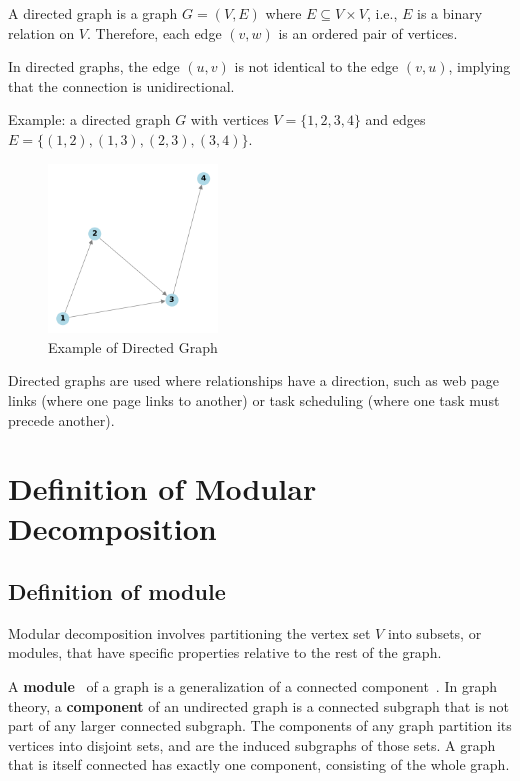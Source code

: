 A directed graph is a graph $G = (V, E)$ where $E \subseteq V \times V$, i.e., $E$ is a binary relation on $V$.
Therefore, each edge $(v, w)$ is an ordered pair of vertices.

In directed graphs, the edge $(u, v)$ is not identical to the edge $(v, u)$, implying that the connection is unidirectional.

Example: a directed graph $G$ with vertices $V = \{1, 2, 3, 4\}$ and edges $E = \{(1, 2), (1, 3), (2, 3), (3 , 4)\}$.

\begin{figure}[!h]
    \centering
    \includegraphics[width=0.40\textwidth]{images/graphs/directed_graph}
    \caption{Example of Directed Graph}
    \label{fig:example-directed-graph}
\end{figure}

Directed graphs are used where relationships have a direction, such as web page links (where one page links to another) or task scheduling (where one task must precede another).


\section{Definition of Modular Decomposition}\label{sec:definition-of-modular-decomposition}

\subsection*{Definition of module}\label{subsec:definition-of-module}

Modular decomposition involves partitioning the vertex set $V$ into subsets, or modules, that have specific properties relative to the rest of the graph.

A \textbf{module}~\cite{mdwikipedia} of a graph is a generalization of a connected component~\cite{componentwikipedia}.
In graph theory, a \textbf{component} of an undirected graph is a connected subgraph that is not part of any larger connected subgraph.
The components of any graph partition its vertices into disjoint sets, and are the induced subgraphs of those sets.
A graph that is itself connected has exactly one component, consisting of the whole graph.

